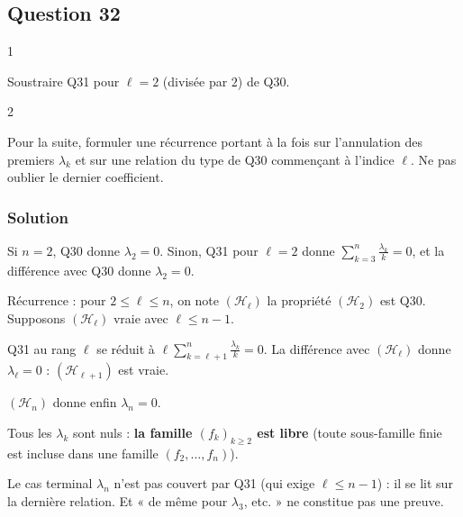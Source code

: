 \documentclass[11pt,a4paper]{article}
\newcommand{\equationajustee}[1]{%
  \sbox{\boiteequation}{$\displaystyle #1$}%
  \ifdim\wd\boiteequation>\linewidth
    \[\resizebox{\linewidth}{!}{\usebox{\boiteequation}}\]%
  \else
    \[#1\]%
  \fi}
\begin{document}
\hypertarget{question-32}{%
\subsection{Question 32}\label{question-32}}

\begin{indication}{1}

Soustraire Q31 pour \(\ell=2\) (divisée par \(2\)) de Q30.

\end{indication}

\begin{indication}{2}

Pour la suite, formuler une récurrence portant à la fois sur l'annulation des premiers \(\lambda_k\) et sur une relation du type de Q30 commençant à l'indice \(\ell\). Ne pas oublier le dernier coefficient.

\end{indication}

\hypertarget{solution-31}{%
\subsubsection{Solution}\label{solution-31}}

Si \(n=2\), Q30 donne \(\lambda_2=0\). Sinon, Q31 pour \(\ell=2\) donne \(\sum_{k=3}^n\frac{\lambda_k}k=0\), et la différence avec Q30 donne \(\lambda_2=0\).

Récurrence : pour \(2\leqslant\ell\leqslant n\), on note \((\mathcal H_\ell)\) la propriété
\equationajustee{\begin{aligned}{}&\lambda_2=\dots=\lambda_{\ell-1}=0\\&\text{et}\ \sum_{k=\ell}^n\frac{\lambda_k}k=0.\end{aligned}}
\((\mathcal H_2)\) est Q30. Supposons \((\mathcal H_\ell)\) vraie avec \(\ell\leqslant n-1\).

Q31 au rang \(\ell\) se réduit à \(\ell\sum_{k=\ell+1}^n\frac{\lambda_k}k=0\). La différence avec \((\mathcal H_\ell)\) donne \(\lambda_\ell=0\) : \((\mathcal H_{\ell+1})\) est vraie.

\((\mathcal H_n)\) donne enfin \(\lambda_n=0\).

Tous les \(\lambda_k\) sont nuls : \textbf{la famille \((f_k)_{k\geqslant2}\) est libre} (toute sous-famille finie est incluse dans une famille \((f_2,\dots,f_n)\)).

\begin{piege}

Le cas terminal \(\lambda_n\) n'est pas couvert par Q31 (qui exige \(\ell\leqslant n-1\)) : il se lit sur la dernière relation. Et « de même pour \(\lambda_3\), etc. » ne constitue pas une preuve.

\end{piege}
\end{document}
